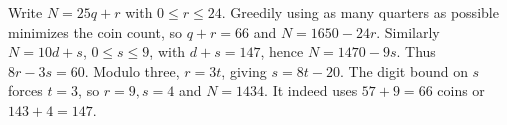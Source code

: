 Write $N=25q+r$ with $0\le r\le24$. Greedily using as many quarters as possible minimizes the coin count, so $q+r=66$ and $N=1650-24r$. Similarly $N=10d+s$, $0\le s\le9$, with $d+s=147$, hence $N=1470-9s$. Thus $8r-3s=60$. Modulo three, $r=3t$, giving $s=8t-20$. The digit bound on $s$ forces $t=3$, so $r=9,s=4$ and $\boxed{N=1434}$. It indeed uses $57+9=66$ coins or $143+4=147$.
